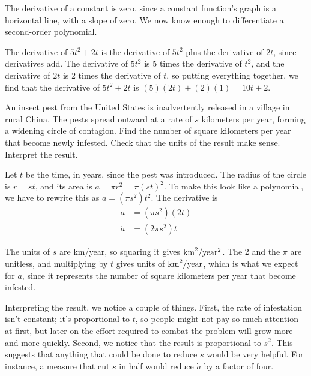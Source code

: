 The derivative of a constant is zero, since a constant function's graph is a
horizontal line, with a slope of zero. We now know enough to differentiate a second-order
polynomial.

\begin{eg}\label{eg:diff-quadratic}
The derivative of $5t^2+2t$ is the derivative of $5t^2$ plus the derivative of
$2t$, since derivatives add. The derivative of $5t^2$ is 5 times the derivative
of $t^2$, and the derivative of $2t$ is 2 times the derivative of $t$, so
putting everything together, we find that the derivative of $5t^2+2t$
is $(5)(2t)+(2)(1)=10t+2$.
\end{eg}

\begin{eg}\label{pest}
\egquestion An insect pest from the United States is inadvertently released in
a village in rural China. The pests spread outward at a rate of $s$ kilometers
per year, forming a widening circle of contagion. Find the number of square
kilometers per year that become newly infested. Check that the units of the result
make sense. Interpret the result.

\eganswer Let $t$ be the time, in years, since the pest was introduced.
The radius of the circle is $r=st$, and its area is $a=\pi r^2=\pi(st)^2$.
To make this look like a polynomial, we have to rewrite this as
$a=(\pi s^2)t^2$. The derivative is
\begin{align*}
  \dot{a} &= (\pi s^2)(2t) \\
  \dot{a} &= (2\pi s^2) t
\end{align*}

The units of $s$ are km/year, so squaring it gives $\textup{km}^2/\textup{year}^2$.
The 2 and the $\pi$ are unitless, and multiplying by $t$ gives units
of $\textup{km}^2/\textup{year}$, which is what we expect for $\dot{a}$, since
it represents the number of square kilometers per year that become infested.

Interpreting the result, we notice a couple of things. First, the rate
of infestation isn't constant; it's proportional to $t$, so people might not
pay so much attention at first, but later on the effort required to combat the
problem will grow more and more quickly. Second, we notice that the
result is proportional to $s^2$. This suggests that anything that could be
done to reduce $s$ would be very helpful. For instance, a measure that cut
$s$ in half would reduce $\dot{a}$ by a factor of four.
\end{eg}

